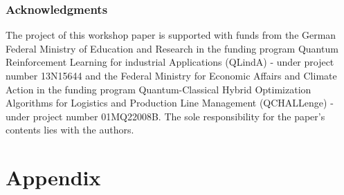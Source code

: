 \documentclass{article} %
\begin{document}



\subsubsection*{Acknowledgments}
The project of this workshop paper is supported with funds from the German Federal Ministry of Education and Research in the funding program Quantum Reinforcement Learning for industrial Applications (QLindA) - under project number 13N15644 and the Federal Ministry for Economic Affairs and Climate Action in the funding program Quantum-Classical Hybrid Optimization Algorithms for Logistics and Production Line Management (QCHALLenge) - under project number 01MQ22008B. The sole responsibility for the paper’s contents lies with the authors.




\newpage
\appendix
\section{Appendix}
\end{document}
